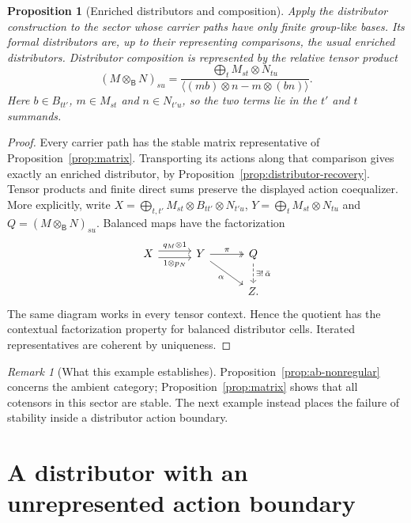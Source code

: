 \documentclass[11pt,a4paper]{article}
\newtheorem{proposition}[theorem]{Proposition}
\theoremstyle{definition}
\theoremstyle{remark}
\newtheorem{remark}[theorem]{Remark}
\numberwithin{equation}{section}
\begin{document}
\begin{proposition}[Enriched distributors and composition]\label{prop:enriched-distributors}
Apply the distributor construction to the sector whose carrier paths
have only finite group-like bases. Its formal distributors are, up to
their representing comparisons, the usual enriched distributors.
Distributor composition is represented by the relative tensor product
\[
(M\otimes_{\mathsf B}N)_{su}
=
\frac{\displaystyle\bigoplus_t M_{st}\otimes N_{tu}}
{\bigl\langle (mb)\otimes n-m\otimes(bn)\bigr\rangle}.
\]
Here $b\in B_{tt'}$, $m\in M_{st}$ and $n\in N_{t'u}$, so the two
terms lie in the $t'$ and $t$ summands.
\end{proposition}
\begin{proof}
Every carrier path has the stable matrix representative of
Proposition~\ref{prop:matrix}. Transporting its actions along that
comparison gives exactly an enriched distributor, by
Proposition~\ref{prop:distributor-recovery}.
Tensor products and finite direct sums preserve the displayed action
coequalizer. More explicitly, write
$X=\bigoplus_{t,t'}M_{st}\otimes B_{tt'}\otimes N_{t'u}$,
$Y=\bigoplus_t M_{st}\otimes N_{tu}$ and
$Q=(M\otimes_{\mathsf B}N)_{su}$. Balanced maps have the factorization
\[
\begin{tikzcd}[column sep=3em]
X \arrow[r,shift left=.7ex,"q_M\otimes1"]
  \arrow[r,shift right=.7ex,"1\otimes p_N"'] &
Y \arrow[r,two heads,"\pi"] \arrow[dr,"\alpha"'] &
Q \arrow[d,dashed,"\exists!\,\bar\alpha"]\\
&& Z.
\end{tikzcd}
\]
The same diagram works in every tensor context. Hence the quotient has
the contextual factorization property for balanced distributor cells.
Iterated representatives are coherent by uniqueness.
\end{proof}

\begin{remark}[What this example establishes]
Proposition~\ref{prop:ab-nonregular} concerns the ambient category;
Proposition~\ref{prop:matrix} shows that all cotensors in this sector
are stable. The next example instead places the failure of stability
inside a distributor action boundary.
\end{remark}

\section{A distributor with an unrepresented action boundary}
\label{sec:strong}
\end{document}
